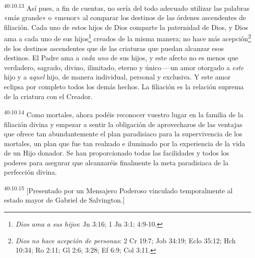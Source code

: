 \par
\textsuperscript{40:10.13} Así pues, a fin de cuentas, no sería del todo adecuado utilizar las palabras «más grande» o «menor» al comparar los destinos de las órdenes ascendentes de filiación. Cada uno de estos hijos de Dios comparte la paternidad de Dios, y Dios ama a cada uno de sus hijos\footnote{\textit{Dios ama a sus hijos}: Jn 3:16; 1 Jn 3:1; 4:9-10.} creados de la misma manera; no hace más acepción\footnote{\textit{Dios no hace acepción de personas}: 2 Cr 19:7; Job 34:19; Eclo 35:12; Hch 10:34; Ro 2:11; Gl 2:6; 3:28; Ef 6:9; Col 3:11.} de los destinos ascendentes que de las criaturas que puedan alcanzar esos destinos. El Padre ama a \textit{cada uno} de sus hijos, y este afecto no es menos que verdadero, sagrado, divino, ilimitado, eterno y único ---un amor otorgado a \textit{este} hijo y a \textit{aquel} hijo, de manera individual, personal y exclusiva. Y este amor eclipsa por completo todos los demás hechos. La filiación es la relación suprema de la criatura con el Creador.

\par
\textsuperscript{40:10.14} Como mortales, ahora podéis reconocer vuestro lugar en la familia de la filiación divina y empezar a sentir la obligación de aprovecharos de las ventajas que ofrece tan abundantemente el plan paradisiaco para la supervivencia de los mortales, un plan que fue tan realzado e iluminado por la experiencia de la vida de un Hijo donador. Se han proporcionado todas las facilidades y todos los poderes para asegurar que alcanzaréis finalmente la meta paradisiaca de la perfección divina.

\par
\textsuperscript{40:10.15} [Presentado por un Mensajero Poderoso vinculado temporalmente al estado mayor de Gabriel de Salvington.]